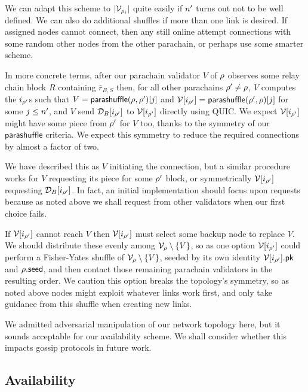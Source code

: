 We can adapt this scheme to $|\mathcal{V}_{\rho_i}|$ quite easily if $n'$ turns out not to be well defined.  We can also do additional shuffles if more than one link is desired.  If assigned nodes cannot connect, then any still online attempt connections with some random other nodes from the other parachain, or perhaps use some smarter scheme. 

In more concrete terms, after our parachain validator $V$ of $\rho$ observes some relay chain block $R$ containing $\bar{r}_{B,S}$ then, for all other parachains $\rho' \ne \rho$, $V$ computes the $i_{\rho'}$s such that $V = \mathsf{parashuffle}(\rho,\rho')[j]$ and $\mathcal{V}[i_{\rho'}] = \mathsf{parashuffle}(\rho',\rho)[j]$ for some $j \leq n'$, and $V$ send $\mathcal{D}_B[i_{\rho'}]$ to $\mathcal{V}[i_{\rho'}]$ directly using QUIC.  We expect $\mathcal{V}[i_{\rho'}]$ might have some piece from $\rho'$ for $V$ too, thanks to the symmetry of our $\mathsf{parashuffle}$ criteria.  We expect this symmetry to reduce the required connections by almost a factor of two.

We have described this as $V$ initiating the connection, but a similar procedure works for $V$ requesting its piece for some $\rho'$ block, or symmetrically $\mathcal{V}[i_{\rho'}]$ requesting $\mathcal{D}_B[i_{\rho'}]$.  In fact, an initial implementation should focus upon requests because as noted above we shall request from other validators when our first choice fails. 

If $\mathcal{V}[i_{\rho'}]$ cannot reach $V$ then $\mathcal{V}[i_{\rho'}]$ must select some backup node to replace $V$.  We should distribute these evenly among $\mathcal{V}_{\rho} \setminus \{V\}$, so as one option $\mathcal{V}[i_{\rho'}]$ could perform a Fisher-Yates shuffle of $\mathcal{V}_{\rho} \setminus \{V\}$, seeded by its own identity $\mathcal{V}[i_{\rho'}].\mathsf{pk}$ and $\rho.\mathsf{seed}$, and then contact those remaining parachain validators in the resulting order.  We caution this option breaks the topology's symmetry, so as noted above nodes might exploit whatever links work first, and only take guidance from this shuffle when creating new links.  

We admitted adversarial manipulation of our network topology here, but it sounds acceptable for our availability scheme.  We shall consider whether this impacts gossip protocols in future work. 


\subsection{Availability} %
\label{sec:availability}

